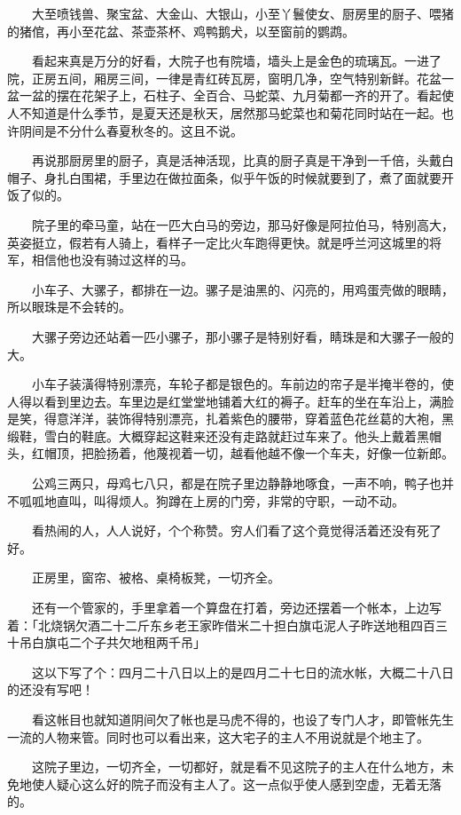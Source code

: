 \documentclass[UTF8]{ctexart}
\begin{document}
　　大至喷钱兽、聚宝盆、大金山、大银山，小至丫鬟使女、厨房里的厨子、喂猪的猪倌，再小至花盆、茶壶茶杯、鸡鸭鹅犬，以至窗前的鹦鹉。

　　看起来真是万分的好看，大院子也有院墙，墙头上是金色的琉璃瓦。一进了院，正房五间，厢房三间，一律是青红砖瓦房，窗明几净，空气特别新鲜。花盆一盆一盆的摆在花架子上，石柱子、全百合、马蛇菜、九月菊都一齐的开了。看起使人不知道是什么季节，是夏天还是秋天，居然那马蛇菜也和菊花同时站在一起。也许阴间是不分什么春夏秋冬的。这且不说。

　　再说那厨房里的厨子，真是活神活现，比真的厨子真是干净到一千倍，头戴白帽子、身扎白围裙，手里边在做拉面条，似乎午饭的时候就要到了，煮了面就要开饭了似的。

　　院子里的牵马童，站在一匹大白马的旁边，那马好像是阿拉伯马，特别高大，英姿挺立，假若有人骑上，看样子一定比火车跑得更快。就是呼兰河这城里的将军，相信他也没有骑过这样的马。

　　小车子、大骡子，都排在一边。骡子是油黑的、闪亮的，用鸡蛋壳做的眼睛，所以眼珠是不会转的。

　　大骡子旁边还站着一匹小骡子，那小骡子是特别好看，睛珠是和大骡子一般的大。

　　小车子装潢得特别漂亮，车轮子都是银色的。车前边的帘子是半掩半卷的，使人得以看到里边去。车里边是红堂堂地铺着大红的褥子。赶车的坐在车沿上，满脸是笑，得意洋洋，装饰得特别漂亮，扎着紫色的腰带，穿着蓝色花丝葛的大袍，黑缎鞋，雪白的鞋底。大概穿起这鞋来还没有走路就赶过车来了。他头上戴着黑帽头，红帽顶，把脸扬着，他蔑视着一切，越看他越不像一个车夫，好像一位新郎。

　　公鸡三两只，母鸡七八只，都是在院子里边静静地啄食，一声不响，鸭子也并不呱呱地直叫，叫得烦人。狗蹲在上房的门旁，非常的守职，一动不动。

　　看热闹的人，人人说好，个个称赞。穷人们看了这个竟觉得活着还没有死了好。

　　正房里，窗帘、被格、桌椅板凳，一切齐全。

　　还有一个管家的，手里拿着一个算盘在打着，旁边还摆着一个帐本，上边写着：「北烧锅欠酒二十二斤东乡老王家昨借米二十担白旗屯泥人子昨送地租四百三十吊白旗屯二个子共欠地租两千吊」

　　这以下写了个：四月二十八日以上的是四月二十七日的流水帐，大概二十八日的还没有写吧！

　　看这帐目也就知道阴间欠了帐也是马虎不得的，也设了专门人才，即管帐先生一流的人物来管。同时也可以看出来，这大宅子的主人不用说就是个地主了。

　　这院子里边，一切齐全，一切都好，就是看不见这院子的主人在什么地方，未免地使人疑心这么好的院子而没有主人了。这一点似乎使人感到空虚，无着无落的。
\end{document}

